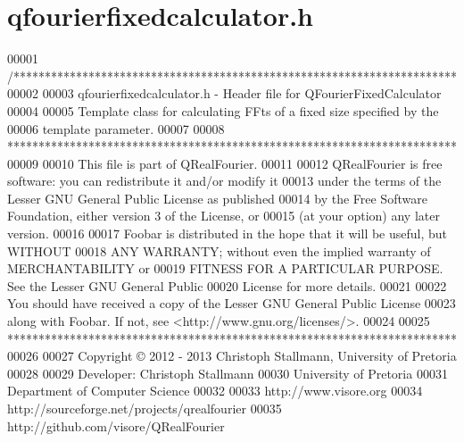 \hypertarget{a00120_source}{\section{qfourierfixedcalculator.\+h}
\label{a00120_source}
}

\begin{DoxyCode}
00001 \textcolor{comment}{/***********************************************************************}
00002 \textcolor{comment}{}
00003 \textcolor{comment}{qfourierfixedcalculator.h - Header file for QFourierFixedCalculator}
00004 \textcolor{comment}{}
00005 \textcolor{comment}{Template class for calculating FFts of a fixed size specified by the}
00006 \textcolor{comment}{template parameter.}
00007 \textcolor{comment}{}
00008 \textcolor{comment}{************************************************************************}
00009 \textcolor{comment}{}
00010 \textcolor{comment}{This file is part of QRealFourier.}
00011 \textcolor{comment}{}
00012 \textcolor{comment}{QRealFourier is free software: you can redistribute it and/or modify it}
00013 \textcolor{comment}{under the terms of the Lesser GNU General Public License as published}
00014 \textcolor{comment}{by the Free Software Foundation, either version 3 of the License, or}
00015 \textcolor{comment}{(at your option) any later version.}
00016 \textcolor{comment}{}
00017 \textcolor{comment}{Foobar is distributed in the hope that it will be useful, but WITHOUT}
00018 \textcolor{comment}{ANY WARRANTY; without even the implied warranty of MERCHANTABILITY or}
00019 \textcolor{comment}{FITNESS FOR A PARTICULAR PURPOSE.  See the Lesser GNU General Public}
00020 \textcolor{comment}{License for more details.}
00021 \textcolor{comment}{}
00022 \textcolor{comment}{You should have received a copy of the Lesser GNU General Public License}
00023 \textcolor{comment}{along with Foobar.  If not, see <http://www.gnu.org/licenses/>.}
00024 \textcolor{comment}{}
00025 \textcolor{comment}{************************************************************************}
00026 \textcolor{comment}{}
00027 \textcolor{comment}{Copyright © 2012 - 2013 Christoph Stallmann, University of Pretoria}
00028 \textcolor{comment}{}
00029 \textcolor{comment}{Developer: Christoph Stallmann}
00030 \textcolor{comment}{University of Pretoria}
00031 \textcolor{comment}{Department of Computer Science}
00032 \textcolor{comment}{}
00033 \textcolor{comment}{http://www.visore.org}
00034 \textcolor{comment}{http://sourceforge.net/projects/qrealfourier}
00035 \textcolor{comment}{http://github.com/visore/QRealFourier}

\end{DoxyCode}
